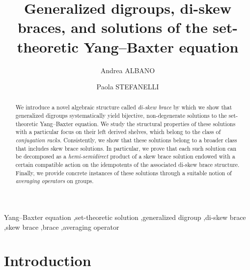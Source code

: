\documentclass[preprint,1p]{elsarticle}
\numberwithin{equation}{section}
\theoremstyle{definition}               %
\begin{document}
\begin{frontmatter}

\title{Generalized digroups, di-skew braces, and solutions of the set-theoretic Yang--Baxter equation}


\author{Andrea ALBANO}

\author{Paola STEFANELLI}

\address{Dipartimento di Matematica e Fisica ``Ennio De Giorgi", Universit\`a del Salento, \\ Via Provinciale Lecce-Arnesano, 73100 Lecce (Italy)}


\begin{abstract}
We introduce a novel algebraic structure called \emph{di-skew brace} by which we show that generalized digroups systematically yield bijective, non-degenerate solutions to the set-theoretic Yang--Baxter equation. 
We study the structural properties of these solutions with a particular focus on their left derived shelves, which belong to the class of \emph{conjugation racks}.
Consistently, we show that these solutions belong to a broader class that includes skew brace solutions.
In particular, we prove that each such solution can be decomposed as a \emph{hemi-semidirect} product of a skew brace solution endowed with a certain compatible action on the idempotents of the associated di-skew brace structure.
Finally, we provide concrete instances of these solutions through a suitable notion of \emph{averaging operators} on groups.
\end{abstract}

\begin{keyword}
Yang--Baxter equation \sep set-theoretic solution \sep generalized digroup \sep di-skew brace \sep skew brace \sep brace \sep averaging operator
 
\end{keyword}
\end{frontmatter}


\section*{Introduction}
\end{document}
